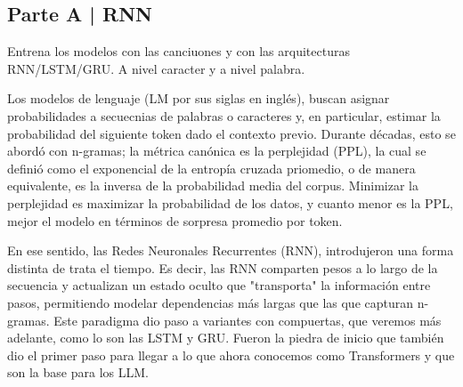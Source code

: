 \newpage

\begin{myblock}
\section*{Parte A | RNN}

    Entrena los modelos con las canciuones y con las arquitecturas RNN/LSTM/GRU. A nivel
    caracter y a nivel palabra.

\end{myblock}





Los modelos de lenguaje (LM por sus siglas en inglés), buscan asignar probabilidades 
a secuecnias de palabras o caracteres y, en particular, estimar la probabilidad del 
siguiente token dado el contexto previo. Durante décadas, esto se abordó con n-gramas;
la métrica canónica es la perplejidad (PPL), la cual se definió como el exponencial de
la entropía cruzada priomedio, o de manera equivalente, es la inversa de la probabilidad
media del corpus. Minimizar la perplejidad es maximizar la probabilidad de los datos, y 
cuanto menor es la PPL, mejor el modelo en términos de sorpresa promedio por token. 

En ese sentido, las Redes Neuronales Recurrentes (RNN), introdujeron una forma distinta de trata el tiempo. Es decir, las RNN comparten pesos a lo largo de la secuencia y actualizan un estado oculto que "transporta" la información entre pasos, permitiendo modelar dependencias más largas que las que capturan n-gramas. Este paradigma dio paso a variantes con compuertas, que veremos más adelante, como lo son las LSTM y GRU. Fueron la piedra de inicio que también dio el primer paso para llegar a lo que ahora conocemos como Transformers y que son la base para los LLM. 

